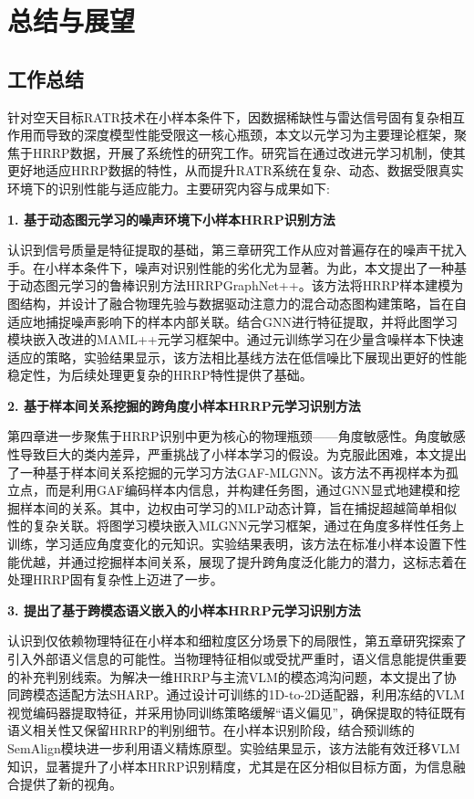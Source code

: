 \chapter{总结与展望}
\label{chap:conclusion}

\section{工作总结}
\label{sec
}

针对空天目标RATR技术在小样本条件下，因数据稀缺性与雷达信号固有复杂相互作用而导致的深度模型性能受限这一核心瓶颈，本文以元学习为主要理论框架，聚焦于HRRP数据，开展了系统性的研究工作。研究旨在通过改进元学习机制，使其更好地适应HRRP数据的特性，从而提升RATR系统在复杂、动态、数据受限真实环境下的识别性能与适应能力。主要研究内容与成果如下:

\textbf{1. 基于动态图元学习的噪声环境下小样本HRRP识别方法}

认识到信号质量是特征提取的基础，第三章研究工作从应对普遍存在的噪声干扰入手。在小样本条件下，噪声对识别性能的劣化尤为显著。为此，本文提出了一种基于动态图元学习的鲁棒识别方法HRRPGraphNet++。该方法将HRRP样本建模为图结构，并设计了融合物理先验与数据驱动注意力的混合动态图构建策略，旨在自适应地捕捉噪声影响下的样本内部关联。结合GNN进行特征提取，并将此图学习模块嵌入改进的MAML++元学习框架中。通过元训练学习在少量含噪样本下快速适应的策略，实验结果显示，该方法相比基线方法在低信噪比下展现出更好的性能稳定性，为后续处理更复杂的HRRP特性提供了基础。

\textbf{2. 基于样本间关系挖掘的跨角度小样本HRRP元学习识别方法}

第四章进一步聚焦于HRRP识别中更为核心的物理瓶颈——角度敏感性。角度敏感性导致巨大的类内差异，严重挑战了小样本学习的假设。为克服此困难，本文提出了一种基于样本间关系挖掘的元学习方法GAF-MLGNN。该方法不再视样本为孤立点，而是利用GAF编码样本内信息，并构建任务图，通过GNN显式地建模和挖掘样本间的关系。其中，边权由可学习的MLP动态计算，旨在捕捉超越简单相似性的复杂关联。将图学习模块嵌入MLGNN元学习框架，通过在角度多样性任务上训练，学习适应角度变化的元知识。实验结果表明，该方法在标准小样本设置下性能优越，并通过挖掘样本间关系，展现了提升跨角度泛化能力的潜力，这标志着在处理HRRP固有复杂性上迈进了一步。

\textbf{3. 提出了基于跨模态语义嵌入的小样本HRRP元学习识别方法}

认识到仅依赖物理特征在小样本和细粒度区分场景下的局限性，第五章研究探索了引入外部语义信息的可能性。当物理特征相似或受扰严重时，语义信息能提供重要的补充判别线索。为解决一维HRRP与主流VLM的模态鸿沟问题，本文提出了协同跨模态适配方法SHARP。通过设计可训练的1D-to-2D适配器，利用冻结的VLM视觉编码器提取特征，并采用协同训练策略缓解“语义偏见”，确保提取的特征既有语义相关性又保留HRRP的判别细节。在小样本识别阶段，结合预训练的SemAlign模块进一步利用语义精炼原型。实验结果显示，该方法能有效迁移VLM知识，显著提升了小样本HRRP识别精度，尤其是在区分相似目标方面，为信息融合提供了新的视角。

